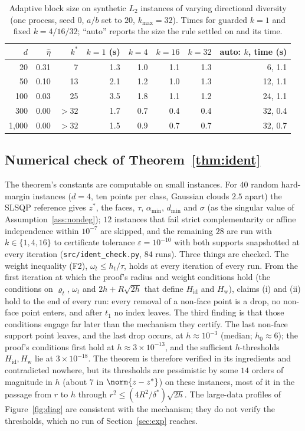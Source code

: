 \begin{table}[t]\centering\scriptsize
\caption{Adaptive block size on synthetic $L_2$ instances of varying
directional diversity (one process, seed 0, $a/b$ set to $20$,
$k_{\max}=32$). Times for guarded $k{=}1$ and fixed $k=4/16/32$; ``auto''
reports the size the rule settled on and its time.}\label{tab:adaptive}
\begin{tabular}{rrrrrrrr}\toprule
$d$ & $\hat\eta$ & $k^*$ & $k{=}1$ (s) & $k{=}4$ & $k{=}16$ & $k{=}32$ & auto: $k$, time (s) \\\midrule
20 & 0.31 & 7 & 1.3 & 1.0 & 1.1 & 1.3 & 6, 1.1 \\
50 & 0.10 & 13 & 2.1 & 1.2 & 1.0 & 1.3 & 12, 1.1 \\
100 & 0.03 & 25 & 3.5 & 1.8 & 1.1 & 1.2 & 24, 1.1 \\
300 & 0.00 & $>32$ & 1.7 & 0.7 & 0.4 & 0.4 & 32, 0.4 \\
1,000 & 0.00 & $>32$ & 1.5 & 0.9 & 0.7 & 0.7 & 32, 0.7 \\
\bottomrule\end{tabular}\end{table}

\subsection{Numerical check of Theorem~\ref{thm:ident}}\label{sec:ident-check}

The theorem's constants are computable on small instances. For $40$
random hard-margin instances ($d=4$, ten points per class, Gaussian
clouds $2.5$ apart) the SLSQP reference gives $z^*$, the faces, $\tau$,
$\alpha_{\min}$, $d_{\min}$ and $\sigma$ (as the singular value of
Assumption~\ref{ass:nondeg}); $12$ instances that fail strict
complementarity or affine independence within $10^{-7}$ are skipped, and
the remaining $28$ are run with $k\in\{1,4,16\}$ to certificate tolerance $\varepsilon=10^{-10}$
with both supports snapshotted at every iteration
(\texttt{src/ident\_check.py}, $84$ runs). Three things are checked. The
weight inequality (F2), $\omega_t\le h_t/\tau$, holds at every iteration
of every run. From the first iteration at which the proof's radius and
weight conditions hold (the conditions on $\varrho_t$, $\omega_t$ and
$2h+R\sqrt{2h}$ that define $H_{\mathrm{id}}$ and $H_{\mathrm w}$),
claims (i) and (ii) hold to the end of every run: every removal of a
non-face point is a drop, no non-face point enters, and after
$t_1$ no index leaves. The third finding is that those conditions
engage far later than the mechanism they certify. The last non-face
support point leaves, and the last drop occurs, at $h\approx10^{-3}$
(median; $h_0\approx6$); the proof's conditions first hold at
$h\approx3\times10^{-13}$, and the sufficient $h$-thresholds
$H_{\mathrm{id}},H_{\mathrm w}$ lie at $3\times10^{-18}$. The theorem is
therefore verified in its ingredients and contradicted nowhere, but its
thresholds are pessimistic by some $14$ orders of magnitude in $h$
(about $7$ in $\norm{z-z^*}$) on these instances, most of it in the
passage from $r$ to $h$ through $r^2\le(4R^2/\delta^*)\sqrt{2h}$. The
large-data profiles of Figure~\ref{fig:diag} are consistent with the
mechanism; they do not verify the thresholds, which no run of
Section~\ref{sec:exp} reaches.
